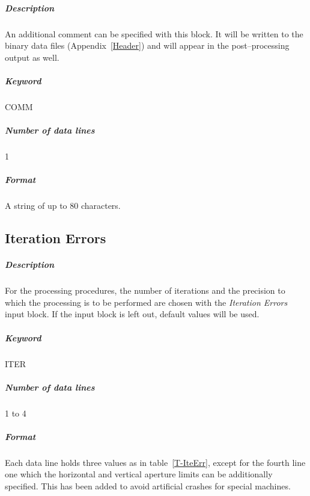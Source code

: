 \documentclass[a4paper,11pt]{report}
\begin{document}
\subparagraph{Description} An additional comment can be specified with
this block.  It will be written to the binary data files
(Appendix~\ref{Header}) and will appear in the post--processing output
as well.

\subparagraph{Keyword} COMM \subparagraph{Number of data lines} 1

\subparagraph{Format} A string of up to 80 characters.

\subsection{Iteration Errors} \label{IteErr}

\subparagraph{Description} For the processing procedures, the number
of iterations and the precision to which the processing is to be
performed are chosen with the {\em Iteration Errors} \/input block.
If the input block is left out, default values will be used.

\subparagraph{Keyword} ITER \subparagraph{Number of data lines} 1 to 4

\subparagraph{Format} Each data line holds three values as in
table~\ref{T-IteErr}, except for the fourth line one which the horizontal
and vertical aperture limits can be additionally specified. This has
been added to avoid artificial crashes for special machines.
\end{document}
